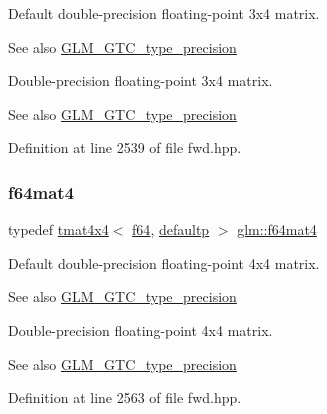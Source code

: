 Default double-\/precision floating-\/point 3x4 matrix. \begin{DoxySeeAlso}{See also}
\mbox{\hyperlink{group__gtc__type__precision}{G\+L\+M\+\_\+\+G\+T\+C\+\_\+type\+\_\+precision}}
\end{DoxySeeAlso}
Double-\/precision floating-\/point 3x4 matrix. \begin{DoxySeeAlso}{See also}
\mbox{\hyperlink{group__gtc__type__precision}{G\+L\+M\+\_\+\+G\+T\+C\+\_\+type\+\_\+precision}} 
\end{DoxySeeAlso}


Definition at line 2539 of file fwd.\+hpp.

\mbox{\label{group__gtc__type__precision_ga5bfcfa195cfe908fe50ecc15abbf7979}} 
\subsubsection{\texorpdfstring{f64mat4}{f64mat4}}
{\footnotesize\ttfamily typedef \mbox{\hyperlink{structglm_1_1tmat4x4}{tmat4x4}}$<$ \mbox{\hyperlink{group__gtc__type__precision_ga2bba392e555124b36cde6abba349bab3}{f64}}, \mbox{\hyperlink{namespaceglm_a0f04f086094c747d227af4425893f545a9d21ccd8b5a009ec7eb7677befc3bf51}{defaultp}} $>$ \mbox{\hyperlink{group__gtc__type__precision_ga5bfcfa195cfe908fe50ecc15abbf7979}{glm\+::f64mat4}}}

Default double-\/precision floating-\/point 4x4 matrix. \begin{DoxySeeAlso}{See also}
\mbox{\hyperlink{group__gtc__type__precision}{G\+L\+M\+\_\+\+G\+T\+C\+\_\+type\+\_\+precision}}
\end{DoxySeeAlso}
Double-\/precision floating-\/point 4x4 matrix. \begin{DoxySeeAlso}{See also}
\mbox{\hyperlink{group__gtc__type__precision}{G\+L\+M\+\_\+\+G\+T\+C\+\_\+type\+\_\+precision}} 
\end{DoxySeeAlso}


Definition at line 2563 of file fwd.\+hpp.

\mbox{\label{group__gtc__type__precision_ga13dbaf75e4f1b18c35d2837067a14ce9}} 
